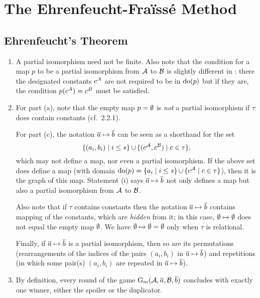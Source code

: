 \setcounter{chapter}{1}
\chapter{The Ehrenfeucht-Fra\"{i}ss\'{e} Method}
\setcounter{section}{1}
\section{Ehrenfeucht's Theorem}
\begin{enumerate}[1.]
%
\item {} A partial isomorphism need not be finite.
\newpar
Also note that the condition for a map $p$ to be a partial isomorphism from $\mathcal{A}$ to $\mathcal{B}$ is slightly different in \cite{EFT}: there the designated constants $c^{A}$ are not required to be in $\mathrm{do}(p)$ but if they are, the condition $p(c^{A}) = c^{B}$ must be satisfied.
%
\item {} For part (a), note that the empty map $p = \emptyset$ is \emph{not} a partial isomorphism if $\tau$ does contain constants (cf.\ 2.2.1).

For part (c), the notation $\overline{a} \mapsto \overline{b}$ can be seen as a shorthand for the set
\[
{\{(a_i, b_i) \mid i \leq s\}} \mathop{\cup} {\{(c^{\mathcal{A}}, c^{\mathcal{B}}) \mid c \in \tau\}},
\]
which may not define a map, nor even a partial isomorphism. If the above set does define a map (with domain $\mathrm{do}(p) = {\{a_i \mid i \leq s\}} \mathop{\cup} {\{c^{\mathcal{A}} \mid c \in \tau\}}$), then it is the graph of this map. Statement (i) says $\overline{a} \mapsto \overline{b}$ not only defines a map but also a partial isomorphism from $\mathcal{A}$ to $\mathcal{B}$.

Also note that if $\tau$ contains constants then the notation $\overline{a} \mapsto \overline{b}$ contains mapping of the constants, which are \emph{hidden} from it; in this case, $\emptyset \mapsto \emptyset$ does not equal the empty map $\emptyset$. We have $\emptyset \mapsto \emptyset = \emptyset$ only when $\tau$ is relational.

Finally, if $\overline{a} \mapsto \overline{b}$ is a partial isomorphism, then so are its permutations (rearrangements of the indices of the pairs $(a_i, b_i)$ in $\overline{a} \mapsto \overline{b}$) and repetitions (in which some pair(s) $(a_i, b_i)$ are repeated in $\overline{a} \mapsto \overline{b}$).
%
\item {} By definition, every round of the game $\game{m}(\strct{A}, \vect{a}, \strct{B}, \vect{b})$ concludes with exactly one winner, either the spoiler or the duplicator.


\end{enumerate}
